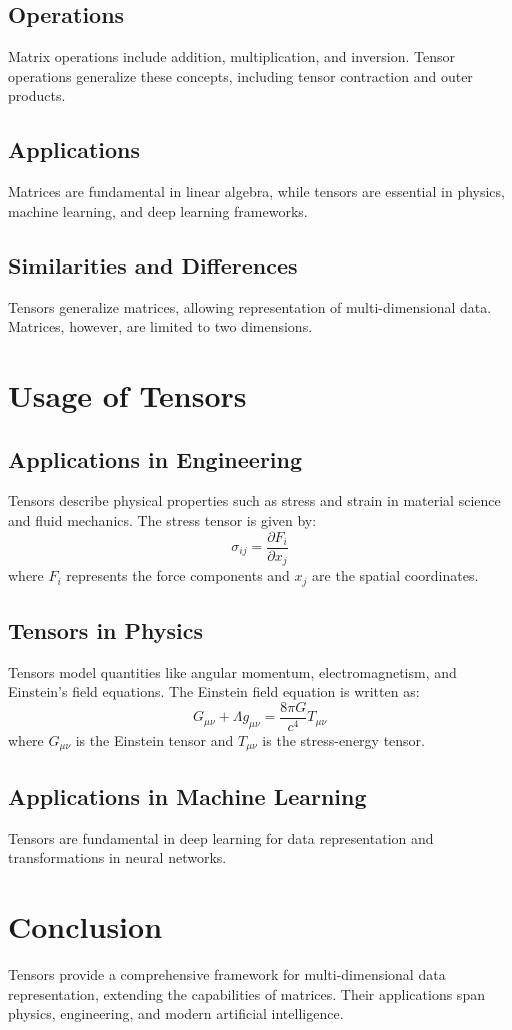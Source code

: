 \documentclass[a4paper,12pt]{article}
\begin{document}
	\subsection{Operations}
	Matrix operations include addition, multiplication, and inversion. Tensor operations generalize these concepts, including tensor contraction and outer products.
	
	\subsection{Applications}
	Matrices are fundamental in linear algebra, while tensors are essential in physics, machine learning, and deep learning frameworks.
	
	\subsection{Similarities and Differences}
	Tensors generalize matrices, allowing representation of multi-dimensional data. Matrices, however, are limited to two dimensions.
	
	\section{Usage of Tensors}
	\subsection{Applications in Engineering}
	Tensors describe physical properties such as stress and strain in material science and fluid mechanics. The stress tensor is given by:
	\begin{equation}
		\sigma_{ij} = \frac{\partial F_i}{\partial x_j}
	\end{equation}
	where $F_i$ represents the force components and $x_j$ are the spatial coordinates.
	
	\subsection{Tensors in Physics}
	Tensors model quantities like angular momentum, electromagnetism, and Einstein's field equations. The Einstein field equation is written as:
	\begin{equation}
		G_{\mu\nu} + \Lambda g_{\mu\nu} = \frac{8\pi G}{c^4} T_{\mu\nu}
	\end{equation}
	where $G_{\mu\nu}$ is the Einstein tensor and $T_{\mu\nu}$ is the stress-energy tensor.
	
	\subsection{Applications in Machine Learning}
	Tensors are fundamental in deep learning for data representation and transformations in neural networks.
	
	\section{Conclusion}
	Tensors provide a comprehensive framework for multi-dimensional data representation, extending the capabilities of matrices. Their applications span physics, engineering, and modern artificial intelligence.
	
\end{document}
